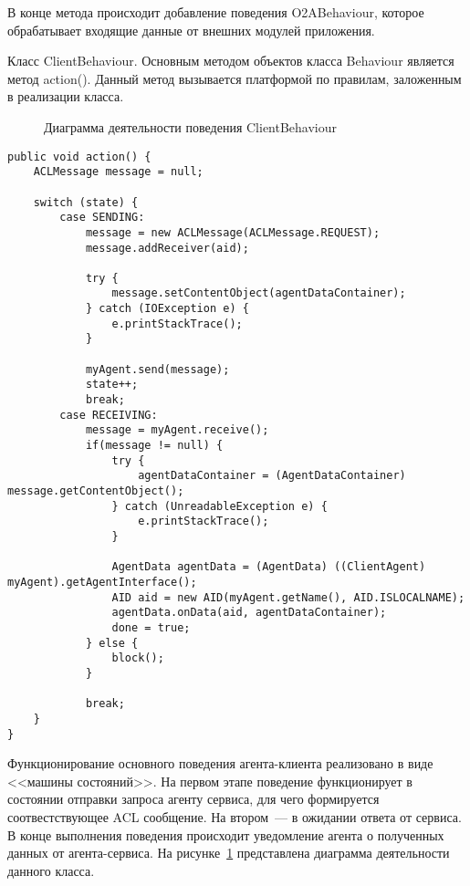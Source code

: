 В конце метода происходит добавление поведения O2ABehaviour, которое обрабатывает входящие данные от внешних модулей приложения.

Класс ClientBehaviour. Основным методом объектов класса Behaviour является метод action(). Данный метод вызывается платформой по правилам, заложенным в реализации класса.

\begin{figure}[h!]
\caption{Диаграмма деятельности поведения ClientBehaviour}
\label{3:client-beh}
\end{figure}

\begin{lstlisting}
public void action() {
    ACLMessage message = null;

    switch (state) {
        case SENDING:
            message = new ACLMessage(ACLMessage.REQUEST);
            message.addReceiver(aid);

            try {
                message.setContentObject(agentDataContainer);
            } catch (IOException e) {
                e.printStackTrace();
            }

            myAgent.send(message);
            state++;
            break;
        case RECEIVING:
            message = myAgent.receive();
            if(message != null) {
                try {
                    agentDataContainer = (AgentDataContainer) message.getContentObject();
                } catch (UnreadableException e) {
                    e.printStackTrace();
                }

                AgentData agentData = (AgentData) ((ClientAgent) myAgent).getAgentInterface();
                AID aid = new AID(myAgent.getName(), AID.ISLOCALNAME);
                agentData.onData(aid, agentDataContainer);
                done = true;
            } else {
                block();
            }

            break;
    }
}
\end{lstlisting}

Функционирование основного поведения агента-клиента реализовано в виде <<машины состояний>>. На первом этапе поведение функционирует в состоянии отправки запроса агенту сервиса, для чего формируется соотвестствующее ACL сообщение. На втором~--- в ожидании ответа от сервиса. В конце выполнения поведения происходит уведомление агента о полученных данных от агента-сервиса.
На рисунке~\ref{3:client-beh} представлена диаграмма деятельности данного класса.

